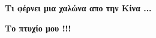 
\clearpage


\vspace*{4mm}
\begin{flushleft}
\textbf{Τι φέρνει μια χαλώνα απο την Κίνα ...}
\end{flushleft}

\vspace*{2mm}
\begin{center}
\textbf{\Large Το πτυχίο μου !!!}
\end{center}

